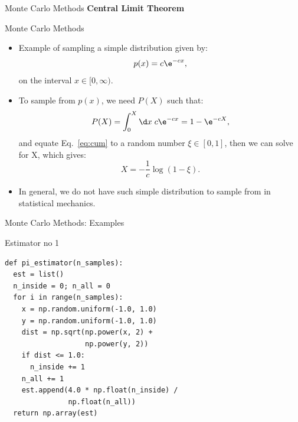 \documentclass[10pt]{beamer}
\begin{document}
\begin{frame}{Monte Carlo Methods}
\textbf{Central Limit Theorem}\vspace{0.2cm}
\end{frame}

\begin{frame}{Monte Carlo Methods}
\begin{itemize}
\setlength\itemsep{1em}
  \item Example of sampling a simple distribution given by:
  \begin{equation}
    p(x) = c\e^{-cx},
  \end{equation}
  on the interval $x\in [0, \infty)$.

  \item To sample from $p(x)$, we need $P(X)$ such that:
  \begin{equation}
    \label{eq:cum}
    P(X) = \int_0^X \d x\; c\e^{-cx} = 1 - \e^{-cX},
  \end{equation}
  and equate Eq.~\ref{eq:cum} to a random number $\xi \in [0,1]$, then we can solve for X, which gives:
  \begin{equation}
    X = -\frac{1}{c}\log(1-\xi).
  \end{equation}

  \item In general, we do not have such simple distribution to sample from in statistical mechanics.
\end{itemize}
\end{frame}

\begin{frame}[fragile]{Monte Carlo Methods: Examples}
\begin{block}{Estimator no 1}
\begin{lstlisting}
def pi_estimator(n_samples):
  est = list()
  n_inside = 0; n_all = 0
  for i in range(n_samples):
    x = np.random.uniform(-1.0, 1.0)
    y = np.random.uniform(-1.0, 1.0)
    dist = np.sqrt(np.power(x, 2) +
                   np.power(y, 2))
    if dist <= 1.0:
      n_inside += 1
    n_all += 1
    est.append(4.0 * np.float(n_inside) /
               np.float(n_all))
  return np.array(est)
\end{lstlisting}
\end{block}
\end{frame}
\end{document}
